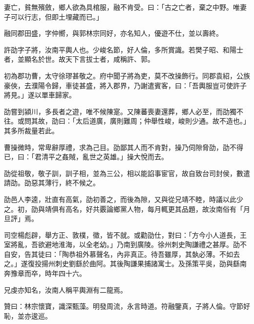 \begin{pinyinscope}
妻亡，貧無殯斂，鄉人欲為具棺服，融不肯受。曰：「古之亡者，棄之中野。唯妻子可以行志，但即土埋藏而已。」

融同郡田盛，字仲嚮，與郭林宗同好，亦名知人，優遊不仕，並以壽終。

許劭字子將，汝南平輿人也。少峻名節，好人倫，多所賞識。若樊子昭、和陽士者，並顯名於世。故天下言拔士者，咸稱許、郭。

初為郡功曹，太守徐璆甚敬之。府中聞子將為吏，莫不改操飾行。同郡袁紹，公族豪俠，去濮陽令歸，車徒甚盛，將入郡界，乃謝遣賓客，曰：「吾輿服豈可使許子將見。」遂以單車歸家。

劭嘗到潁川，多長者之遊，唯不候陳寔。又陳蕃喪妻還葬，鄉人必至，而劭獨不往。或問其故，劭曰：「太后道廣，廣則難周；仲舉性峻，峻則少通。故不造也。」其多所裁量若此。

曹操微時，常卑辭厚禮，求為己目。劭鄙其人而不肯對，操乃伺隙脅劭，劭不得已，曰：「君清平之姦賊，亂世之英雄。」操大悅而去。

劭從祖敬，敬子訓，訓子相，並為三公，相以能諂事宦官，故自致台司封侯，數遣請劭。劭惡其薄行，終不候之。

劭邑人李逵，壯直有高氣，劭初善之，而後為隙，又與從兄靖不睦，時議以此少之。初，劭與靖俱有高名，好共覈論鄉黨人物，每月輒更其品題，故汝南俗有「月旦評」焉。

司空楊彪辟，舉方正、敦樸，徵，皆不就。或勸劭仕，對曰：「方今小人道長，王室將亂，吾欲避地淮海，以全老幼。」乃南到廣陵。徐州刺史陶謙禮之甚厚。劭不自安，告其徒曰：「陶恭祖外慕聲名，內非真正。待吾雖厚，其埶必薄。不如去之。」遂復投揚州刺史劉繇於曲阿。其後陶謙果捕諸寓士。及孫策平吳，劭與繇南奔豫章而卒，時年四十六。

兄虔亦知名，汝南人稱平輿淵有二龍焉。

贊曰：林宗懷寶，識深甄藻。明發周流，永言時道。符融鑒真，子將人倫。守節好恥，並亦逡巡。


\end{pinyinscope}